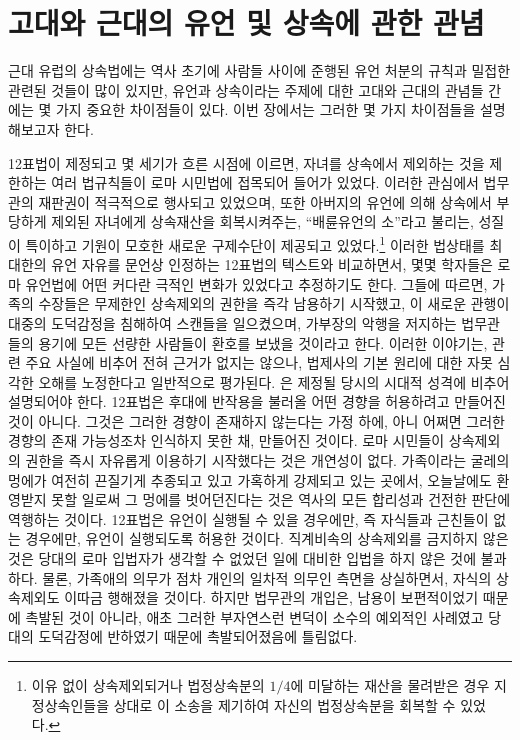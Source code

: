 \chapter{고대와 근대의 유언 및 상속에 관한 관념}

근대 유럽의 상속법에는
역사 초기에 사람들 사이에 준행된 유언 처분의 규칙과
밀접한 관련된 것들이 많이 있지만,
유언과 상속이라는 주제에 대한 고대와 근대의 관념들 간에는
몇 가지 중요한 차이점들이 있다.
이번 장에서는 그러한 몇 가지 차이점들을 설명해보고자 한다.

12표법이 제정되고 몇 세기가 흐른 시점에 이르면,
자녀를 상속에서 제외하는 것을 제한하는
여러 법규칙들이
로마 시민법에
접목되어 들어가 있었다.
이러한 관심에서 법무관의 재판권이 적극적으로 행사되고 있었으며,
또한
아버지의 유언에 의해 상속에서 부당하게 제외된 자녀에게
상속재산을 회복시켜주는,
%
``배륜유언의
소''라고 불리는,
성질이 특이하고 기원이 모호한 새로운 구제수단이 제공되고 있었다.\footnote{%
  이유 없이 상속제외되거나
  법정상속분의 $1/4$에 미달하는 재산을 물려받은 경우
  지정상속인들을 상대로 이 소송을 제기하여 자신의 법정상속분을
  회복할 수 있었다. }
이러한 법상태를
최대한의 유언 자유를 문언상 인정하는 12표법의 텍스트와 비교하면서,
몇몇 학자들은 로마 유언법에 어떤 커다란 극적인 변화가 있었다고
추정하기도 한다.
그들에 따르면,
가족의 수장들은 무제한인 상속제외의 권한을 즉각 남용하기 시작했고,
이 새로운 관행이 대중의 도덕감정을 침해하여 스캔들을 일으켰으며,
가부장의 악행을 저지하는 법무관들의 용기에 모든 선량한 사람들이
환호를 보냈을 것이라고 한다.
이러한 이야기는,
관련 주요 사실에 비추어 전혀 근거가 없지는 않으나,
법제사의 기본 원리에 대한 자못 심각한 오해를 노정한다고
일반적으로 평가된다.
은 제정될 당시의 시대적 성격에 비추어 설명되어야 한다.
12표법은 후대에 반작용을 불러올 어떤 경향을 허용하려고 만들어진 것이 아니다.
그것은 그러한 경향이 존재하지 않는다는 가정 하에,
아니 어쩌면 그러한 경향의 존재 가능성조차 인식하지 못한 채,
만들어진 것이다.
로마 시민들이 상속제외의 권한을 즉시 자유롭게 이용하기 시작했다는 것은
개연성이 없다.
가족이라는 굴레의 멍에가
여전히 끈질기게 추종되고 있고
가혹하게 강제되고 있는 곳에서,
오늘날에도 환영받지 못할 일로써
그 멍에를 벗어던진다는 것은
역사의 모든 합리성과 건전한 판단에 역행하는 것이다.
12표법은 유언이 실행될 수 있을 경우에만,
즉 자식들과 근친들이 없는 경우에만,
유언이
실행되도록 허용한 것이다.
직계비속의 상속제외를 금지하지 않은 것은
당대의 로마 입법자가 생각할 수 없었던 일에 대비한 입법을
하지 않은 것에 불과하다.
물론, 가족애의 의무가 점차 개인의 일차적 의무인 측면을 상실하면서,
자식의 상속제외도 이따금 행해졌을 것이다.
하지만 법무관의 개입은,
남용이 보편적이었기 때문에 촉발된 것이 아니라,
애초 그러한 부자연스런 변덕이 소수의 예외적인 사례였고
당대의 도덕감정에 반하였기 때문에 촉발되어졌음에 틀림없다.


